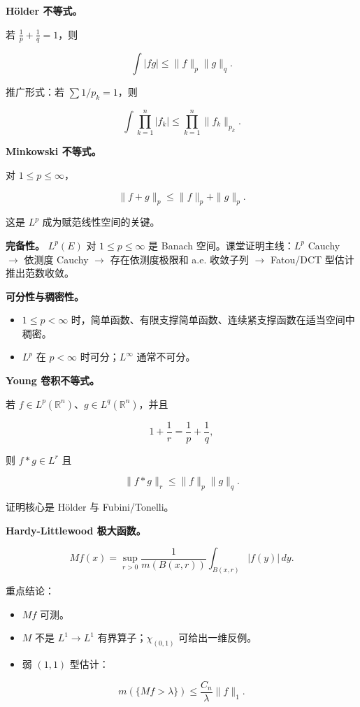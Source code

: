 \documentclass[
UTF8]{ctexart}
\providecommand{\tightlist}{%
\setlength{\itemsep}{0pt}\setlength{\parskip}{0pt}}
\begin{document}
\textbf{Hölder 不等式。}

若 \(\frac1p+\frac1q=1\)，则

\[
  \int |fg|\le \|f\|_p\|g\|_q.
\]

推广形式：若 \(\sum 1/p_k=1\)，则

\[
  \int \prod_{k=1}^n |f_k|
  \le \prod_{k=1}^n \|f_k\|_{p_k}.
\]

\textbf{Minkowski 不等式。}

对 \(1\le p\le\infty\)，

\[
  \|f+g\|_p\le \|f\|_p+\|g\|_p.
\]

这是 \(L^p\) 成为赋范线性空间的关键。

\textbf{完备性。} \(L^p(E)\) 对 \(1\le p\le\infty\) 是 Banach
空间。课堂证明主线：\(L^p\) Cauchy \(\to\) 依测度 Cauchy \(\to\)
存在依测度极限和 a.e. 收敛子列 \(\to\) Fatou/DCT 型估计推出范数收敛。

\textbf{可分性与稠密性。}

\begin{itemize}
    \tightlist
  \item
    \(1\le p<\infty\)
    时，简单函数、有限支撑简单函数、连续紧支撑函数在适当空间中稠密。
  \item
    \(L^p\) 在 \(p<\infty\) 时可分；\(L^\infty\) 通常不可分。
\end{itemize}

\textbf{Young 卷积不等式。}

若 \(f\in L^p(\mathbb R^n)\)、\(g\in L^q(\mathbb R^n)\)，并且

\[
  1+\frac1r=\frac1p+\frac1q,
\]

则 \(f*g\in L^r\) 且

\[
  \|f*g\|_r\le \|f\|_p\|g\|_q.
\]

证明核心是 Hölder 与 Fubini/Tonelli。

\textbf{Hardy-Littlewood 极大函数。}

\[
  Mf(x)=\sup_{r>0}\frac1{m(B(x,r))}\int_{B(x,r)}|f(y)|\,dy.
\]

重点结论：

\begin{itemize}
    \tightlist
  \item
    \(Mf\) 可测。
  \item
    \(M\) 不是 \(L^1\to L^1\) 有界算子；\(\chi_{(0,1)}\) 可给出一维反例。
  \item
    弱 \((1,1)\) 型估计：
\end{itemize}

\[
  m(\{Mf>\lambda\})\le \frac{C_n}{\lambda}\|f\|_1.
\]
\end{document}
